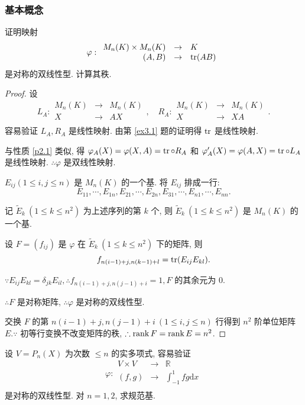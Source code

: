 \documentclass[color=black,device=normal,lang=cn,mode=geye]{elegantnote}
\begin{document}
\subsubsection{基本概念}
\begin{exercisec}[1.7.1(2), 有修改]
    证明映射
    \[\varphi:\begin{array}{rcl}
        M_n(K)\times M_n(K) & \to & K \\
        (A,B) & \to & \operatorname{tr}(AB) \\
    \end{array}\]
    是对称的双线性型. 计算其秩.
\end{exercisec}
\begin{proof}
    设
    \[L_A:\begin{array}{rcl}
            M_n(K) & \to & M_n(K) \\
            X & \to & AX \\
        \end{array},\quad R_A:\begin{array}{rcl}
            M_n(K) & \to & M_n(K) \\
            X & \to & XA \\
        \end{array}.\]
    容易验证 $L_A,R_A$ 是线性映射. 由第 \ref{ex3.1} 题的证明得 $\operatorname{tr} $ 是线性映射.

    与性质 \ref{p2.1} 类似, 得 $\varphi_A(X)=\varphi(X,A)=\operatorname{tr} \circ R_A$ 和 $\varphi_A'(X)=\varphi(A,X)=\operatorname{tr} \circ L_A$ 是线性映射. $\therefore\varphi$ 是双线性映射.

    $E_{ij}(1\leq i,j\leq n)$ 是 $M_n(K)$ 的一个基. 将 $E_{ij}$ 排成一行:
    \[E_{11},\cdots,E_{1n},E_{21},\cdots,E_{2n},E_{31},\cdots,E_{n1},\cdots,E_{nn}.\]

    记 $\tilde{E}_k\ (1\leq k\leq n^2)$ 为上述序列的第 $k$ 个, 则 $\tilde{E}_k\ (1\leq k\leq n^2)$ 是 $M_n(K)$ 的一个基.
    
    设 $F=(f_{ij})$ 是 $\varphi$ 在 $\tilde{E}_k\ (1\leq k\leq n^2)$ 下的矩阵, 则
    \[f_{n(i-1)+j,n(k-1)+l}=\operatorname{tr} (E_{ij}E_{kl}).\]

    $\because E_{ij}E_{kl}=\delta_{jk}E_{il},\therefore f_{n(i-1)+j,n(j-1)+i}=1,F$ 的其余元为 $0$.

    $\therefore F$ 是对称矩阵, $\therefore\varphi$ 是对称的双线性型.

    交换 $F$ 的第 $n(i-1)+j,n(j-1)+i\ (1\leq i,j\leq n)$ 行得到 $n^2$ 阶单位矩阵 $E.\because$ 初等行变换不改变矩阵的秩, $\therefore\operatorname{rank} F=\operatorname{rank} E=n^2$.
\end{proof}
\begin{exercisec}
    设 $V=P_n(X)$ 为次数 $\leq n$ 的实多项式, 容易验证
    \[\varphi:\begin{array}{rcl}
        V\times V & \to & \mathbb{R} \\
        (f,g) & \to & \int_{-1}^1fg\mathrm{d}x \\
    \end{array}\]
    是对称的双线性型. 对 $n=1,2$, 求规范基.
\end{exercisec}
\end{document}
